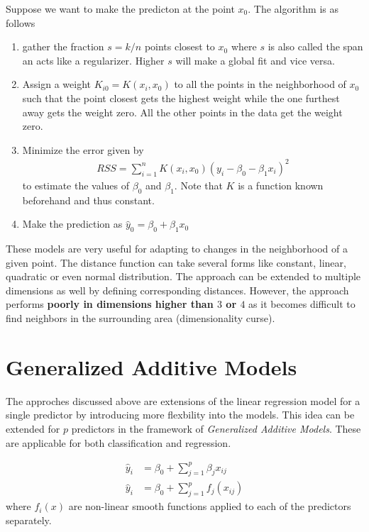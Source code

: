 \documentclass[../statistical_learning_notes.tex]{subfiles}
\begin{document}
    Suppose we want to make the predicton at the point $x_{0}$. The algorithm is as follows
    \begin{enumerate}
        \item gather the fraction $s = k/n$ points closest to $x_{0}$ where $s$ is also called the span an acts like a regularizer. Higher $s$ will make a global fit and vice versa.
        \item Assign a weight $K_{i0} = K(x_{i}, x_{0})$ to all the points in the neighborhood of $x_{0}$ such that the point closest gets the highest weight while the one furthest away gets the weight zero. All the other points in the data get the weight zero.
        \item Minimize the error given by
        \begin{align*}
            RSS = \sum_{i=1}^{n} K(x_{i}, x_{0})(y_{i} - \beta_{0} - \beta_{1}x_{i})^{2}
        \end{align*}
        to estimate the values of $\beta_{0}$ and $\beta_{1}$. Note that $K$ is a function known beforehand and thus constant.
        \item Make the prediction as $\hat{y}_{0} = \beta_{0} + \beta_{1}x_{0}$
    \end{enumerate}

    These models are very useful for adapting to changes in the neighborhood of a given point. The distance function can take several forms like constant, linear, quadratic or even normal distribution.\newline
    The approach can be extended to multiple dimensions as well by defining corresponding distances. However, the approach performs \textbf{poorly in dimensions higher than $3$ or $4$} as it becomes difficult to find neighbors in the surrounding area (dimensionality curse).

    
    \section{Generalized Additive Models}
    The approches discussed above are extensions of the linear regression model for a single predictor by introducing more flexbility into the models. This idea can be extended for $p$ predictors in the framework of \emph{Generalized Additive Models}. These are applicable for both classification and regression.

    \begin{align*}
        \hat{y}_{i} &= \beta_{0} + \sum_{j=1}^{p} \beta_{j} x_{ij} \tag*{Linear Rgerssion}\\
        \hat{y}_{i} &= \beta_{0} + \sum_{j=1}^{p} f_{j}(x_{ij}) \tag*{Generalized Additive Models}
    \end{align*}
    where $f_{i}(x)$ are non-linear smooth functions applied to each of the predictors separately.\newline
\end{document}
